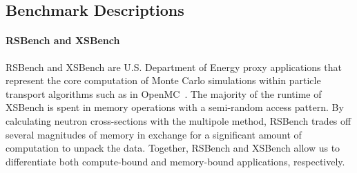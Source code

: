 

\subsection{Benchmark Descriptions}

\paragraph{\textbf{RSBench and XSBench}}
RSBench and XSBench are U.S. Department of Energy proxy applications that represent the core computation of Monte Carlo simulations within particle transport algorithms such as in OpenMC~\cite{romano2013openmc}. The majority of the runtime of XSBench is spent in memory operations with a semi-random access pattern. By calculating neutron cross-sections with the multipole method, RSBench trades off several magnitudes of memory in exchange for a significant amount of computation to unpack the data. Together, RSBench and XSBench allow us to differentiate both compute-bound and memory-bound applications, respectively.



